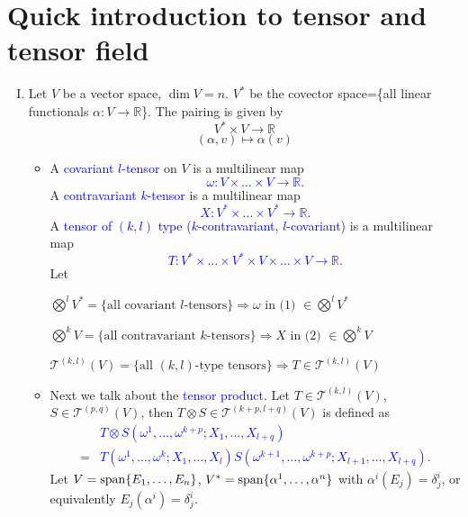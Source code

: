 \section{Quick introduction to tensor and tensor field}
\begin{enumerate}[(I)]
    \item Let \(V\) be a vector space, \(\dim V=n\).
    \(V^*\) be the covector space=\{all linear functionals 
    \(\alpha\colon V\to \mathbb{R}\)\}. The pairing is given by 
    \[V^*\times V\to \mathbb{R}\]
    \[(\alpha,v)\mapsto \alpha(v)\]
    \begin{itemize}
        \item A \textcolor{blue}{covariant \(l\)-tensor} on \(V\)
        is a multilinear map 
        \textcolor{blue}{
            \[
                \omega\colon V\times \ldots \times V\to \mathbb{R}.
                \tag{1}    
            \]
        }
        A \textcolor{blue}{
            contravariant \(k\)-tensor 
        }
        is a multilinear map 
        \textcolor{blue}{
            \[
                X\colon V^*\times \ldots \times V^*\to \mathbb{R}.
                \tag{2}    
            \]
        }
        A \textcolor{blue}{
            tensor of \((k,l)\) type (\(k\)-contravariant, \(l\)-covariant)
        }
        is a multilinear map 
        \textcolor{blue}{
            \[
                T\colon  V^*\times \ldots \times V^*\times 
                V\times \ldots \times V \to \mathbb{R}.
                \tag{3}   
            \]
        }
        Let 
        \begin{center}
            \(
            \bigotimes^l V^*=\{\text{all covariant }l\text{-tensors}\}
            \Rightarrow \omega \text{ in (1) }\in \bigotimes^l V^*    
        \)

        \(
            \bigotimes^k V=\{\text{all contravariant }k\text{-tensors}\}
            \Rightarrow X \text{ in (2) }\in \bigotimes^k V    
        \)

        \(
            \mathcal{T}^{(k,l)}(V)=\{\text{all }(k,l)\text{-type tensors}\}
            \Rightarrow T\in \mathcal{T}^{(k,l)}(V)    
        \)
        \end{center}
        \item Next we talk about the \textcolor{blue}{tensor product}.
        Let \(T\in \mathcal{T}^{(k,l)}(V)\),
        \(S\in \mathcal{T}^{(p,q)}(V)\), then \(T\otimes S \in 
        \mathcal{T}^{(k+p,l+q)}(V)\) is defined as
        \textcolor{blue}{
            \begin{align*}
                &T\otimes S\left(\omega^1,\ldots,\omega^{k+p}
                ;X_1,\ldots, X_{l+q}\right)\\
                =&
                T\left(\omega^1,\ldots,\omega^{k}
                ;X_1,\ldots, X_{l}\right)
                S\left(\omega^{k+1},\ldots,\omega^{k+p}
                ;X_{l+1},\ldots, X_{l+q}\right) .
            \end{align*}
        } 
Let \(V=\operatorname{span}\{E_1,\ldots,E_n\}\),
\(V^*=\operatorname{span}\{\alpha^1,\ldots, \alpha^n\}\) with 
\(\alpha^i (E_j)=\delta^i_j\), or equivalently
\(E_j(\alpha^i)=\delta^i_j\). 


\end{itemize}
\end{enumerate}
